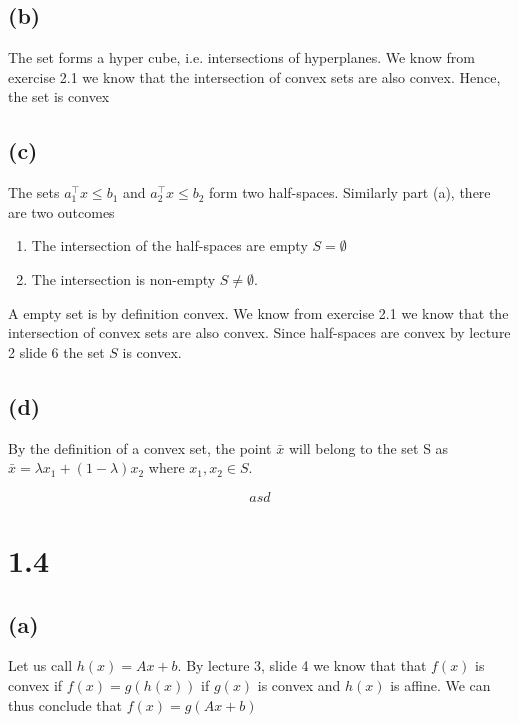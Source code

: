 \documentclass{article}
\begin{document}
	\subsection*{(b)}
		The set forms a hyper cube, i.e. intersections of hyperplanes. We know from exercise 2.1 we know that the intersection of convex sets are also convex. Hence, the set is convex
	\subsection*{(c)}
		The sets $a_1^\top x\leq b_1$ and $a_2^\top x\leq b_2$ form two half-spaces. Similarly part (a), there are two outcomes
		\begin{enumerate}
			\item The intersection of the half-spaces are empty $S=\emptyset$
			\item The intersection is non-empty $S\neq\emptyset$.
		\end{enumerate}
		A empty set is by definition convex. We know from exercise 2.1 we know that the intersection of convex sets are also convex. Since half-spaces are convex by lecture 2 slide 6 the set $S$ is convex.
	\subsection*{(d)}
		By the definition of a convex set, the point $\bar{x}$ will belong to the set S as $\bar{x} = \lambda x_1 + (1-\lambda) x_2$ where $x_1,x_2 \in S$. 
		
		\begin{equation}
			asd
		\end{equation}
		
\section*{1.4}
	\subsection*{(a)}
	Let us call $h(x) = Ax + b$.
	By lecture 3, slide 4 we know that that $f(x)$ is convex if $f(x) = g(h(x))$ if $g(x)$ is convex and $h(x)$ is affine. We can thus conclude that $f(x) = g(Ax+b)$
\end{document}

